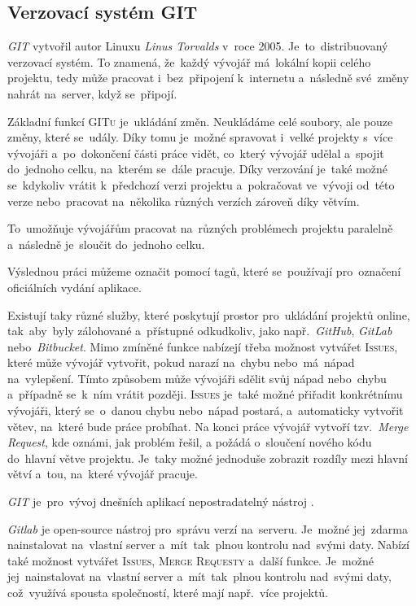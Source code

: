 \documentclass[14pt,a4paper]{article}
\begin{document}
        \subsection{Verzovací systém GIT}
        \emph{GIT} vytvořil autor Linuxu \emph{Linus Torvalds} v~roce 2005. Je~to~distribuovaný verzovací systém. To znamená, že~každý vývojář má~lokální kopii celého projektu, tedy může pracovat i~bez~připojení k~internetu a~následně své~změny nahrát na~server, když se~připojí.
        
        Základní funkcí \textsc{GITu} je~ukládání změn. Neukládáme celé soubory, ale pouze změny, které se~udály. Díky tomu je~možné spravovat i~velké projekty s~více vývojáři a~po~dokončení části práce vidět, co~který vývojář udělal a~spojit do~jednoho celku, na~kterém se~dále pracuje. Díky verzování je~také možné se~kdykoliv vrátit k~předchozí verzi projektu a~pokračovat ve~vývoji od~této verze nebo~pracovat na~několika různých verzích zároveň díky větvím.
        
        To~umožňuje vývojářům pracovat na~různých problémech projektu paralelně a~následně je~sloučit do~jednoho celku.

        Výslednou práci můžeme označit pomocí tagů, které se~používají pro~označení oficiálních vydání aplikace.

        Existují taky různé služby, které poskytují prostor pro~ukládání projektů online, tak~aby~byly zálohované a~přístupné odkudkoliv, jako např.~\emph{GitHub}, \emph{GitLab} nebo~\emph{Bitbucket}. Mimo zmíněné funkce nabízejí třeba možnost vytvářet \textsc{Issues}, které může vývojář vytvořit, pokud narazí na~chybu nebo~má~nápad na~vylepšení. Tímto způsobem může vývojáři sdělit svůj nápad nebo~chybu a~případně se~k~ním vrátit později. \textsc{Issues} je~také možné přiřadit konkrétnímu vývojáři, který se~o~danou chybu nebo~nápad postará, a~automaticky vytvořit větev, na~které bude práce probíhat. Na konci práce vývojář vytvoří tzv.~\emph{Merge Request}, kde oznámi, jak problém řešil, a požádá o~sloučení nového kódu do~hlavní větve projektu. Je~taky možné jednoduše zobrazit rozdíly mezi hlavní větví a~tou, na~které vývojář pracuje.
        
        \emph{GIT} je~pro~vývoj dnešních aplikací nepostradatelný nástroj \cite{gitscmBook}.
        
        \emph{Gitlab} je open-source nástroj pro~správu verzí na~serveru. Je~možné jej~zdarma nainstalovat na~vlastní server a~mít~tak~plnou kontrolu nad~svými daty. Nabízí také možnost vytvářet \textsc{Issues}, \textsc{Merge Requesty} a~další funkce. Je~možné jej~nainstalovat na~vlastní server a~mít~tak~plnou kontrolu nad~svými daty, což~využívá spousta společností, které mají např.~více projektů.
\end{document}
